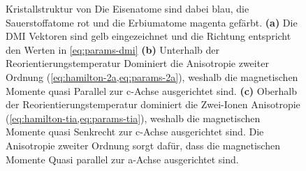 \documentclass[main.tex]{subfiles}
\begin{document}
\begin{figure}[htbp]
	\centering
	\caption{Kristallstruktur von   Die Eisenatome sind dabei blau, die Sauerstoffatome rot und die Erbiumatome magenta gefärbt. 
	\textbf{(a)} Die DMI Vektoren sind gelb eingezeichnet und die Richtung entspricht den Werten in \cref{eq:params-dmi} 
	\textbf{(b)} Unterhalb der Reorientierungstemperatur Dominiert die Anisotropie zweiter Ordnung (\cref{eq:hamilton-2a,eq:params-2a}), weshalb die magnetischen Momente quasi Parallel zur c-Achse ausgerichtet sind. 
	\textbf{(c)} Oberhalb der Reorientierungstemperatur dominiert die Zwei-Ionen Anisotropie (\cref{eq:hamilton-tia,eq:params-tia}), weshalb die magnetischen Momente quasi Senkrecht zur c-Achse ausgerichtet sind. Die Anisotropie zweiter Ordnung sorgt dafür, dass die magnetischen Momente Quasi parallel zur a-Achse ausgerichtet sind.~\cite{schlegel-master}}
	\label{fig:orthoferrit}
\end{figure}
\end{document}
